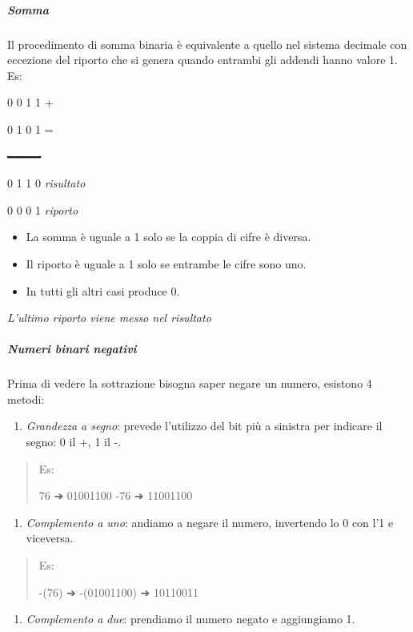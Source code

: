 \subparagraph{\texorpdfstring{\emph{Somma}}{Somma}}\label{somma}

Il procedimento di somma binaria è equivalente a quello nel sistema
decimale con eccezione del riporto che si genera quando entrambi gli
addendi hanno valore 1. Es:

0 0 1 1 +

0 1 0 1 =

━━━━━

0 1 1 0 \emph{risultato}

0 0 0 1 \emph{riporto}

\begin{itemize}
\item
  La somma è uguale a 1 solo se la coppia di cifre è diversa.
\item
  Il riporto è uguale a 1 solo se entrambe le cifre sono uno.
\item
  In tutti gli altri casi produce 0.
\end{itemize}

\emph{L'ultimo riporto viene messo nel risultato}

\subparagraph{\texorpdfstring{\emph{Numeri binari
negativi}}{Numeri binari negativi}}\label{numeri-binari-negativi}

Prima di vedere la sottrazione bisogna saper negare un numero, esistono
4 metodi:

\begin{enumerate}
\def\labelenumi{\arabic{enumi}.}
\item
  \emph{Grandezza a segno}: prevede l'utilizzo del bit più a sinistra
  per indicare il segno: 0 il +, 1 il -.
\end{enumerate}

\begin{quote}
Es:

76 ➔ 01001100 -76 ➔ 11001100
\end{quote}

\begin{enumerate}
\def\labelenumi{\arabic{enumi}.}
\setcounter{enumi}{1}
\item
  \emph{Complemento a uno}: andiamo a negare il numero, invertendo lo 0
  con l'1 e viceversa.
\end{enumerate}

\begin{quote}
Es:

-(76) ➔ -(01001100) ➔ 10110011
\end{quote}

\begin{enumerate}
\def\labelenumi{\arabic{enumi}.}
\setcounter{enumi}{2}
\item
  \emph{Complemento a due}: prendiamo il numero negato e aggiungiamo 1.
\end{enumerate}

